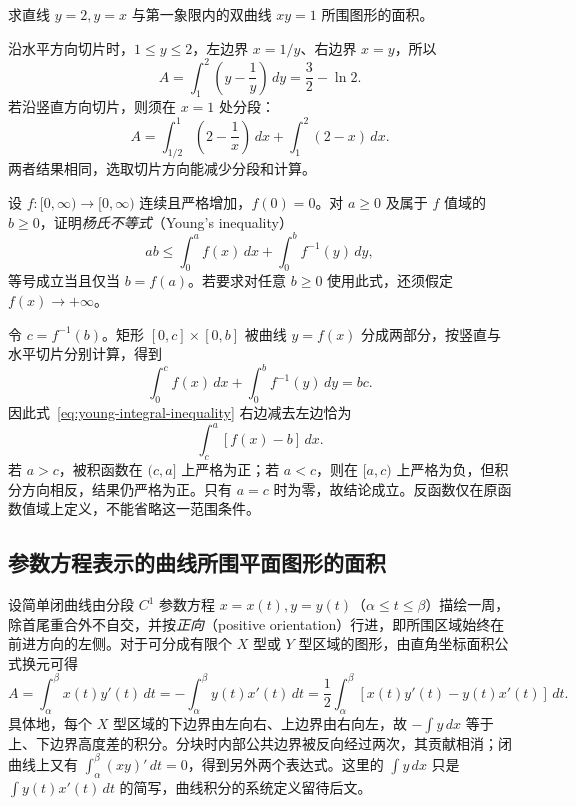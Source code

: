 \begin{example}
\label{ex:area-line-hyperbola}
求直线 $y=2,y=x$ 与第一象限内的双曲线 $xy=1$ 所围图形的面积。
\end{example}
\begin{solve}
沿水平方向切片时，$1\leq y\leq2$，左边界 $x=1/y$、右边界 $x=y$，所以
\[
    A=\int_1^2\left(y-\frac1y\right)\,dy=\frac32-\ln2.
\]
若沿竖直方向切片，则须在 $x=1$ 处分段：
\[
    A=\int_{1/2}^1\left(2-\frac1x\right)\,dx+\int_1^2(2-x)\,dx.
\]
两者结果相同，选取切片方向能减少分段和计算。
\end{solve}

\begin{example}
\label{ex:young-inequality-integral-form}
设 $f:[0,\infty)\to[0,\infty)$ 连续且严格增加，$f(0)=0$。对 $a\geq0$ 及属于 $f$ 值域的 $b\geq0$，证明\emph{杨氏不等式}（Young's inequality）
\begin{equation}
    ab\leq\int_0^af(x)\,dx+\int_0^bf^{-1}(y)\,dy,
    \label{eq:young-integral-inequality}
\end{equation}
等号成立当且仅当 $b=f(a)$。若要求对任意 $b\geq0$ 使用此式，还须假定 $f(x)\to+\infty$。
\end{example}
\begin{solve}
令 $c=f^{-1}(b)$。矩形 $[0,c]\times[0,b]$ 被曲线 $y=f(x)$ 分成两部分，按竖直与水平切片分别计算，得到
\[
    \int_0^cf(x)\,dx+\int_0^bf^{-1}(y)\,dy=bc.
\]
因此式~\eqref{eq:young-integral-inequality} 右边减去左边恰为
\[
    \int_c^a[f(x)-b]\,dx.
\]
若 $a>c$，被积函数在 $(c,a]$ 上严格为正；若 $a<c$，则在 $[a,c)$ 上严格为负，但积分方向相反，结果仍严格为正。只有 $a=c$ 时为零，故结论成立。反函数仅在原函数值域上定义，不能省略这一范围条件。
\end{solve}

\subsection{参数方程表示的曲线所围平面图形的面积}
\label{subsec:plane-areas-enclosed-by-parametric-curves}

设简单闭曲线由分段 $C^1$ 参数方程 $x=x(t),y=y(t)$（$\alpha\leq t\leq\beta$）描绘一周，除首尾重合外不自交，并按\emph{正向}（positive orientation）行进，即所围区域始终在前进方向的左侧。对于可分成有限个 $X$ 型或 $Y$ 型区域的图形，由直角坐标面积公式换元可得
\begin{equation}
    A=\int_\alpha^\beta x(t)y'(t)\,dt
     =-\int_\alpha^\beta y(t)x'(t)\,dt
     =\frac12\int_\alpha^\beta[x(t)y'(t)-y(t)x'(t)]\,dt.
    \label{eq:parametric-enclosed-area}
\end{equation}
具体地，每个 $X$ 型区域的下边界由左向右、上边界由右向左，故 $-\int y\,dx$ 等于上、下边界高度差的积分。分块时内部公共边界被反向经过两次，其贡献相消；闭曲线上又有 $\int_\alpha^\beta(xy)'\,dt=0$，得到另外两个表达式。这里的 $\int y\,dx$ 只是 $\int y(t)x'(t)\,dt$ 的简写，曲线积分的系统定义留待后文。

